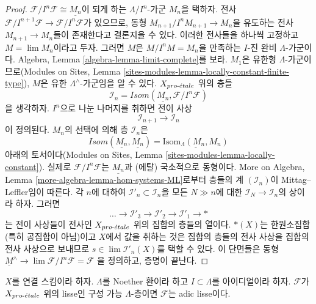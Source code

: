 \begin{proof}
$\mathcal{F}/I^n\mathcal{F} \cong \underline{M_n}$이 되게 하는
$\Lambda/I^n$-가군 $M_n$을 택하자. 전사
$\mathcal{F}/I^{n + 1}\mathcal{F} \to \mathcal{F}/I^n\mathcal{F}$가
있으므로, 동형 $M_{n + 1}/I^nM_{n + 1} \to M_n$을 유도하는 전사
$M_{n + 1} \to M_n$들이 존재한다고 결론지을 수 있다. 이러한
전사들을 하나씩 고정하고 $M = \lim M_n$이라고 두자. 그러면 $M$은
$M/I^nM = M_n$을 만족하는 $I$-진 완비 $\Lambda$-가군이다. Algebra,
Lemma \ref{algebra-lemma-limit-complete}를 보라. $M_1$은 유한형
$\Lambda$-가군이므로(Modules on Sites, Lemma
\ref{sites-modules-lemma-locally-constant-finite-type}), $M$은 유한
$\Lambda^\wedge$-가군임을 알 수 있다. $X_{pro\text{-}\acute{e}tale}$ 위의 층들
$$
\mathcal{I}_n = \mathit{Isom}(\underline{M_n}, \mathcal{F}/I^n\mathcal{F})
$$
을 생각하자. $I^n$으로 나눈 나머지를 취하면 전이 사상
$$
\mathcal{I}_{n + 1} \longrightarrow \mathcal{I}_n
$$
이 정의된다. $M_n$의 선택에 의해 층 $\mathcal{I}_n$은
$$
\mathit{Isom}(\underline{M_n}, \underline{M_n}) =
\underline{\text{Isom}_\Lambda(M_n, M_n)}
$$
아래의 토서이다(Modules on Sites, Lemma
\ref{sites-modules-lemma-locally-constant}). 실제로
$\mathcal{F}/I^n\mathcal{F}$는 $\underline{M_n}$과 (에탈) 국소적으로
동형이다. More on Algebra, Lemma
\ref{more-algebra-lemma-hom-systems-ML}로부터 층들의 계
$(\mathcal{I}_n)$이 Mittag--Leffler임이 따른다. 각 $n$에 대하여
$\mathcal{I}'_n \subset \mathcal{I}_n$을 모든 $N \gg n$에 대한
$\mathcal{I}_N \to \mathcal{I}_n$의 상이라 하자. 그러면
$$
\ldots \to \mathcal{I}'_3 \to \mathcal{I}'_2 \to \mathcal{I}'_1 \to *
$$
는 전이 사상들이 전사인 $X_{pro\text{-}\acute{e}tale}$ 위의 집합의 층들의 열이다.
$*(X)$는 한원소집합(특히 공집합이 아님)이고 $X$에서 값을 취하는 것은
집합의 층들의 전사 사상을 집합의 전사 사상으로 보내므로
$s \in \lim \mathcal{I}'_n(X)$를 택할 수 있다. 이 단면들은 동형
$\underline{M}^\wedge \to \lim \mathcal{F}/I^n\mathcal{F} = \mathcal{F}$
을 정의하고, 증명이 끝난다.
\end{proof}

\begin{lemma}
\label{lemma-connected-lisse}
$X$를 연결 스킴이라 하자. $\Lambda$를 Noether 환이라 하고
$I \subset \Lambda$를 아이디얼이라 하자. $\mathcal{F}$가
$X_{pro\text{-}\acute{e}tale}$ 위의 lisse인 구성 가능 $\Lambda$-층이면
$\mathcal{F}$는 adic lisse이다.
\end{lemma}

